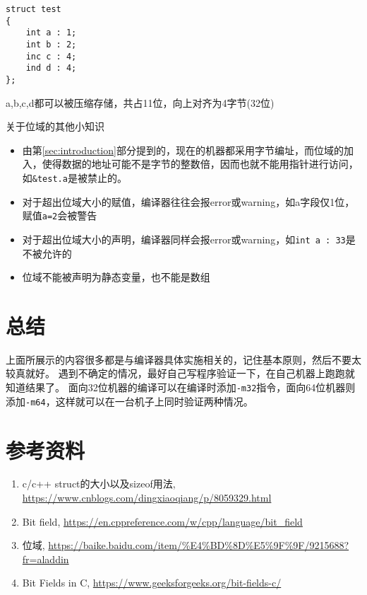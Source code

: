 \documentclass[11pt,UTF8]{ctexart}
\begin{document}
\begin{example}
\begin{lstlisting}
struct test
{
    int a : 1;
    int b : 2;
    inc c : 4;
    ind d : 4;
};
\end{lstlisting}
\end{example}
\begin{analysis}
a,b,c,d都可以被压缩存储，共占11位，向上对齐为4字节(32位)
\end{analysis}

关于位域的其他小知识
\begin{itemize}
	\itemsep -3pt
	\item 由第\ref{sec:introduction}部分提到的，现在的机器都采用字节编址，而位域的加入，使得数据的地址可能不是字节的整数倍，因而也就不能用指针进行访问，如\verb'&test.a'是被禁止的。
	\item 对于超出位域大小的赋值，编译器往往会报error或warning，如a字段仅1位，赋值\verb'a=2'会被警告
	\item 对于超出位域大小的声明，编译器同样会报error或warning，如\verb'int a : 33'是不被允许的
	\item 位域不能被声明为静态变量，也不能是数组
\end{itemize}

\section{总结}
上面所展示的内容很多都是与编译器具体实施相关的，记住基本原则，然后不要太较真就好。
遇到不确定的情况，最好自己写程序验证一下，在自己机器上跑跑就知道结果了。
面向32位机器的编译可以在编译时添加\verb'-m32'指令，面向64位机器则添加\verb'-m64'，这样就可以在一台机子上同时验证两种情况。

\section{参考资料}
\begin{enumerate}
	\itemsep -3pt
	\item c/c++ struct的大小以及sizeof用法, \url{https://www.cnblogs.com/dingxiaoqiang/p/8059329.html}
	\item Bit field, \url{https://en.cppreference.com/w/cpp/language/bit_field}
	\item 位域, \url{https://baike.baidu.com/item/%E4%BD%8D%E5%9F%9F/9215688?fr=aladdin}
	\item Bit Fields in C, \url{https://www.geeksforgeeks.org/bit-fields-c/}
\end{enumerate}
\end{document}
